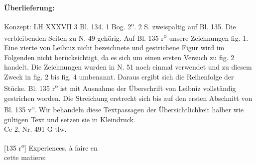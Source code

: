       
               
                \begin{ledgroupsized}[r]{120mm}
                \footnotesize 
                \pstart                
                \noindent\textbf{\"{U}berlieferung:}   
                \pend
                \end{ledgroupsized}
            
              
                            \begin{ledgroupsized}[r]{114mm}
                            \footnotesize 
                            \pstart \parindent -6mm
                            Konzept: LH XXXVII 3 Bl. 134. 1 Bog. 2\textsuperscript{o}. 2 S. zweispaltig auf Bl. 135. Die verbleibenden Seiten zu N. 49\raisebox{-0.5ex}{\notsotiny 3} geh\"{o}rig. Auf Bl. 135 r\textsuperscript{o} unsere Zeichnungen fig. 1. Eine vierte von Leibniz nicht bezeichnete und gestrichene Figur wird im Folgenden nicht berücksichtigt, da es sich um einen ersten Versuch zu fig. 2 handelt. Die Zeichnungen wurden in N. 51 noch einmal verwendet und zu diesem Zweck in fig. 2 bis fig. 4 umbenannt. Daraus ergibt sich die Reihenfolge der St\"{u}cke. Bl. 135 r\textsuperscript{o} ist mit Ausnahme der \"{U}berschrift von Leibniz vollst\"{a}ndig gestrichen worden. Die Streichung erstreckt sich bis auf den ersten Abschnitt von Bl. 135 v\textsuperscript{o}. Wir behandeln diese Textpassagen der \"{U}bersichtlichkeit halber wie g\"{u}ltigen Text und setzen sie in Kleindruck.\\Cc 2, Nr. 491 G tlw. \pend
                            \end{ledgroupsized}
                \vspace*{8mm}
                \pstart 
                \normalsize
            \begin{center}[135 r\textsuperscript{o}] Experiences, \`{a} faire en\\cette matiere:\end{center} %
